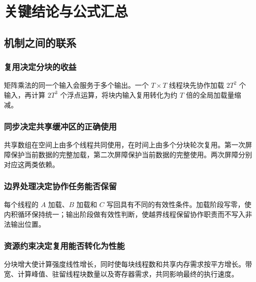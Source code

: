 \section{关键结论与公式汇总}

\subsection{机制之间的联系}
\subsubsection{复用决定分块的收益}
矩阵乘法的同一个输入会服务于多个输出。一个 $T\times T$ 线程块先协作加载 $2T^2$ 个输入，再计算 $2T^3$ 个浮点运算，将块内输入复用转化为约 $T$ 倍的全局加载量缩减。

\subsubsection{同步决定共享缓冲区的正确使用}
共享数组在空间上由多个线程共同使用，在时间上由多个分块轮次复用。第一次屏障保护当前数据的完整加载，第二次屏障保护当前数据的完整使用。两次屏障分别对应这两类依赖。

\subsubsection{边界处理决定协作任务能否保留}
每个线程的 $A$ 加载、$B$ 加载和 $C$ 写回具有不同的有效性条件。加载阶段写零，使内积循环保持统一；输出阶段做有效性判断，使越界线程保留协作职责而不写入非法输出位置。

\subsubsection{资源约束决定复用能否转化为性能}
分块增大使计算强度线性增长，同时使每块线程数和共享内存需求按平方增长。带宽、计算峰值、驻留线程块数量以及寄存器需求，共同影响最终的执行速度。

